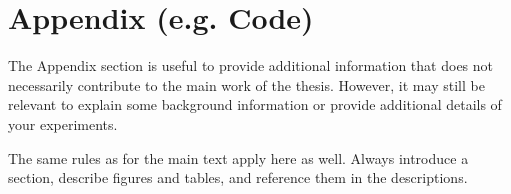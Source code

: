 \chapter{Appendix (e.g. Code)} \label{chap:javacode}

The Appendix section is useful to provide additional information that does not necessarily contribute to the main work of the thesis. However, it may still be relevant to explain some background information or provide additional details of your experiments. 

The same rules as for the main text apply here as well. Always introduce a section, describe figures and tables, and reference them in the descriptions.